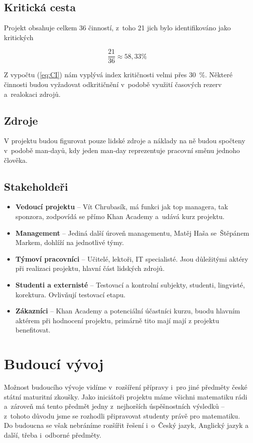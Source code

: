 \documentclass[12pt, a4paper]{report}
\begin{document}
\section{Kritická cesta}
\label{sec:orgf54512f}
Projekt obsahuje celkem 36 činností, z toho 21 jich bylo identifi\-kováno jako
kritických

\begin{equation}
\label{eq:CI}
 \frac{21}{36} \approx 58,33 \%
\end{equation}

Z vypočtu (\ref{eq:CI}) nám vyplývá index kritičnosti velmi přes 30 \%. Některé
činnosti budou vyžadovat odkritičnění v podobě využití časových rezerv
a realokaci zdrojů.

\section{Zdroje}
\label{sec:org84b18a8}
V projektu budou figurovat pouze lidské zdroje a náklady na ně budou spočteny
v podobě man-dayů, kdy jeden man-day reprezentuje pracovní směnu jednoho
člověka.


\section{Stakeholdeři}
\label{sec:orgb0a4513}
\begin{itemize}
\item \textbf{Vedoucí projektu} -- Vít Chrubasík, má funkci jak top managera, tak
sponzora, zodpovídá se přímo Khan Academy a udává kurz projektu.
\item \textbf{Management} -- Jediná další úroveň managementu, Matěj Haša se Štěpánem
Markem, dohlíží na jednotlivé týmy.
\item \textbf{Týmoví pracovníci} -- Učitelé, lektoři, IT specialisté. Jsou důležitými
aktéry při realizaci projektu, hlavní část lidských zdrojů.
\item \textbf{Studenti a externisté} -- Testovací a kontrolní subjekty, studenti,
lingvisté, korektura. Ovlivňují testovací etapu.
\item \textbf{Zákazníci} -- Khan Academy a potenciální účastníci kurzu, buodu hlavním
aktérem při hodnocení projektu, primárně tito mají mají z projektu
benefitovat.
\end{itemize}


\chapter{Budoucí vývoj}
\label{sec:org7d7b1d0}
Možnost budoucího vývoje vidíme v rozšíření přípravy i pro jiné předměty české
státní maturitní zkoušky. Jako iniciátoři projektu máme všichni matematiku rádi
a zároveň má tento předmět jedny z nejhorších úspěšnostních výsledků -- z tohoto
důvodu jsme se rozhodli připravovat studenty právě pro matematiku. Do budoucna
se však nebráníme rozšířit řešení i o Český jazyk, Anglický jazyk a další, třeba
i odborné předměty.
\end{document}
